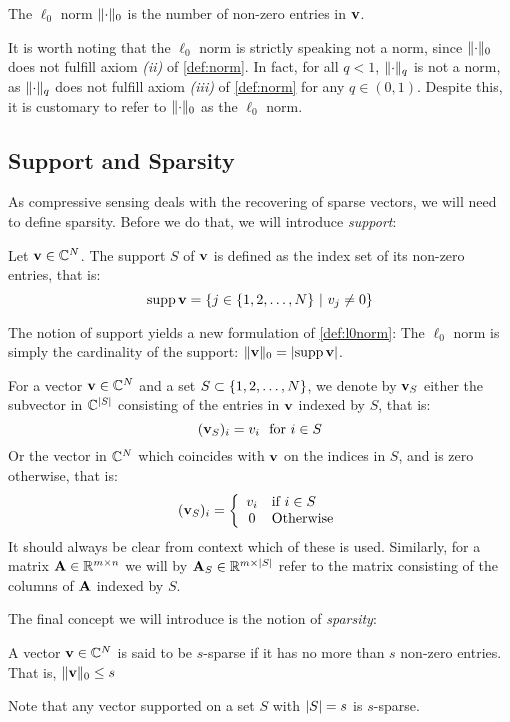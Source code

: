 \begin{definition} \label{def:l0norm}
	The $ \ell_{0} $ norm $ \lVert\cdot\rVert_{0} $ is the number of non-zero entries in $ \mathbf{v} $.
\end{definition}

It is worth noting that the $ \ell_{0} $ norm is strictly speaking not a norm, since $ \lVert\cdot\rVert_{0} $ does not fulfill axiom \textit{(ii)} of \cref{def:norm}. In fact, for all $ q<1 $, $ \lVert\cdot\rVert_{q} $ is not a norm, as $ \lVert\cdot\rVert_{q} $ does not fulfill axiom \textit{(iii)} of \cref{def:norm} for any $ q \in (0, 1) $. Despite this, it is customary to refer to $ \lVert\cdot\rVert_{0} $ as the $ \ell_{0} $ norm.

\subsection{Support and Sparsity}
As compressive sensing deals with the recovering of sparse vectors, we will need to define sparsity. Before we do that, we will introduce \textit{support}:

\begin{definition} \label{def:support}
	Let $ \mathbf{v} \in \mathbb{C}^{N} $. The support $ S $ of $ \mathbf{v} $ is defined as the index set of its non-zero entries, that is:
	\[
		\operatorname{supp} \mathbf{v} = \{j \in \{1, 2, \ldots, N\} ~|~ v_{j} \neq 0\}
	\]
\end{definition}

The notion of support yields a new formulation of \cref{def:l0norm}: The $ \ell_{0} $ norm is simply the cardinality of the support: $ \lVert\mathbf{v}\rVert_{0} = \left|\operatorname{supp} \mathbf{v}\right| $.

For a vector $ \mathbf{v}\in\mathbb{C}^{N} $ and a set $ S \subset \{1, 2, \ldots, N\} $, we denote by $ \mathbf{v}_{S} $ either the subvector in $ \mathbb{C}^{\left|S\right|} $ consisting of the entries in $ \mathbf{v} $ indexed by $ S $, that is:
\begin{equation}
	\label{eq:vSalt1}
	(\mathbf{v}_{S})_{i} = v_{i} \text{~~for } i \in S
\end{equation}
Or the vector in $ \mathbb{C}^{N} $ which coincides with $ \mathbf{v} $ on the indices in $ S $, and is zero otherwise, that is:
\begin{equation}
	\label{eq:vSalt2}
	(\mathbf{v}_{S})_{i} = \left\{ \begin{array}{cl} v_{i} & \text{if } i \in S \\ 0 & \text{Otherwise} \end{array} \right.
\end{equation}
It should always be clear from context which of these is used. Similarly, for a matrix $ \mathbf{A}\in\mathbb{R}^{m \times n} $ we will by $ \mathbf{A}_{S} \in \mathbb{R}^{m \times \left|S\right|} $ refer to the matrix consisting of the columns of $ \mathbf{A} $ indexed by $ S $.

The final concept we will introduce is the notion of \textit{sparsity}:

\begin{definition} A vector $ \mathbf{v} \in \mathbb{C}^{N} $ is said to be $ s $-sparse if it has no more than $ s $ non-zero entries. That is, $ \lVert\mathbf{v}\rVert_{0} \leq s $
\end{definition}

Note that any vector supported on a set $ S $ with $ \left|S\right| = s $ is $ s $-sparse. 